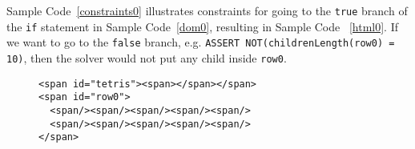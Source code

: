 Sample Code~\ref{constraints0} illustrates constraints for going to the {\tt true} branch of the {\tt if} statement in Sample Code~\ref{dom0}, resulting in Sample Code ~\ref{html0}.  
If we want to go to the {\tt false} branch, e.g. {\tt ASSERT NOT(childrenLength(row0) = 10)}, then the solver would not put any child inside {\tt row0}.  

\begin{figure}
\begin{lstlisting}[caption=Example HTML generated by the DOM solver based on the constraints defined in Sample Code ~\ref{constraints0}.  Note that {\tt row0} is not a child of {\tt tetris} because the source code in Sample Code \ref{dom0} did not require the rows to be children of {\tt tetris}.,label=html0]  
<span id="tetris"><span></span></span>
<span id="row0">
  <span/><span/><span/><span/><span/>
  <span/><span/><span/><span/><span/>
</span>
\end{lstlisting}
\end{figure}
